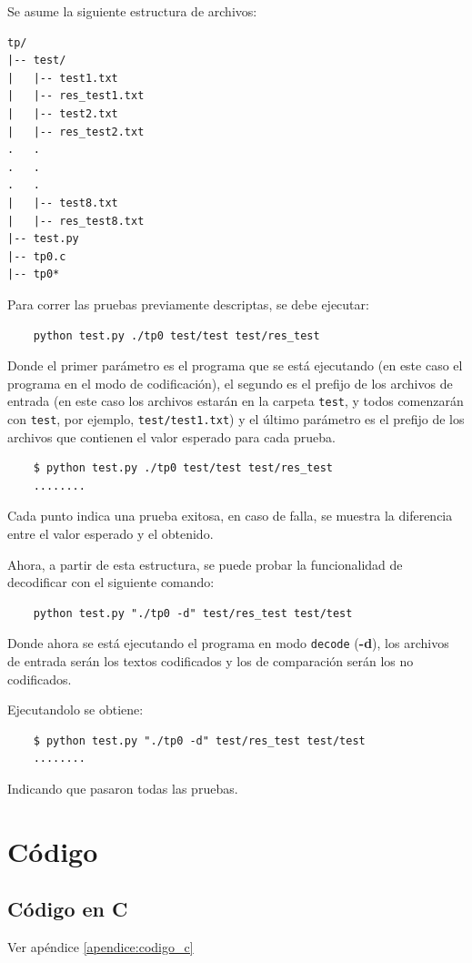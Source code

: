 \documentclass[titlepage,a4paper]{article}
\begin{document}
Se asume la siguiente estructura de archivos:

\begin{lstlisting}[style=test_run_style]
tp/
|-- test/
|   |-- test1.txt
|   |-- res_test1.txt
|   |-- test2.txt
|   |-- res_test2.txt
.   .
.   .
.   .
|   |-- test8.txt
|   |-- res_test8.txt
|-- test.py
|-- tp0.c
|-- tp0*
\end{lstlisting}


Para correr las pruebas previamente descriptas, se debe ejecutar:
\begin{verbatim}
    python test.py ./tp0 test/test test/res_test
\end{verbatim}
Donde el primer parámetro es el programa que se está ejecutando (en este caso el programa en el modo de codificación), el segundo es el prefijo de los archivos de entrada (en este caso los archivos estarán en la carpeta \verb|test|, y todos comenzarán con \verb|test|, por ejemplo, \verb|test/test1.txt|) y el último parámetro es el prefijo de los archivos que contienen el valor esperado para cada prueba.

\begin{verbatim}
    $ python test.py ./tp0 test/test test/res_test
    ........
\end{verbatim}

Cada punto indica una prueba exitosa, en caso de falla, se muestra la diferencia entre el valor esperado y el obtenido.

Ahora, a partir de esta estructura, se puede probar la funcionalidad de decodificar con el siguiente comando:

\begin{verbatim}
    python test.py "./tp0 -d" test/res_test test/test
\end{verbatim}

Donde ahora se está ejecutando el programa en modo \verb|decode| (\textbf{-d}), los archivos de entrada serán los textos codificados y los de comparación serán los no codificados.

Ejecutandolo se obtiene:
\begin{verbatim}
    $ python test.py "./tp0 -d" test/res_test test/test
    ........
\end{verbatim}
Indicando que pasaron todas las pruebas.

\section{Código}
\subsection{Código en C}
Ver apéndice \ref{apendice:codigo_c}
\end{document}
